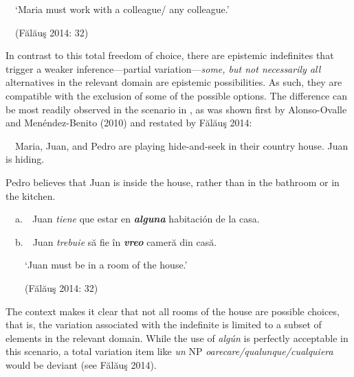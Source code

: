 \begin{styleStandard}
\ \ ‘Maria must work with a colleague/ any colleague.’
\end{styleStandard}

\begin{styleStandard}
\ \ (Fălăuş 2014: 32)
\end{styleStandard}

\begin{styleStandard}
In contrast to this total freedom of choice, there are epistemic indefinites that trigger a weaker inference—partial variation—\textit{some, but not necessarily all }alternatives in the relevant domain are epistemic possibilities. As such, they are compatible with the exclusion of some of the possible options. The difference can be most readily observed in the scenario in , as was shown first by Alonso-Ovalle and Menéndez-Benito (2010) and restated by Fălăuş 2014:
\end{styleStandard}

\begin{styleStandard}
\label{bkm:Ref533761939}\ \ Maria, Juan, and Pedro are playing hide-and-seek in their country house. Juan is hiding. 
\end{styleStandard}

\begin{styleStandard}
Pedro believes that Juan is inside the house, rather than in the bathroom or in the kitchen.
\end{styleStandard}

\begin{styleStandard}
\ \ a.\ \ Juan \textit{tiene} que estar en \textbf{\textit{alguna}} habitación de la casa.
\end{styleStandard}

\begin{styleStandard}
\ \ b.\ \ Juan \textit{trebuie} să fie în \textbf{\textit{vreo}} cameră din casă.
\end{styleStandard}

\begin{styleStandard}
\ \ \ \ ‘Juan must be in a room of the house.’
\end{styleStandard}

\begin{styleStandard}
\ \ \ \ (Fălăuş 2014: 32)
\end{styleStandard}

\begin{styleStandard}
The context makes it clear that not all rooms of the house are possible choices, that is, the variation associated with the indefinite is limited to a subset of elements in the relevant domain. While the use of \textit{algún }is perfectly acceptable in this scenario, a total variation item like \textit{un }NP\textit{ oarecare/qualunque/cualquiera} would be deviant (see Fălăuş 2014).
\end{styleStandard}

